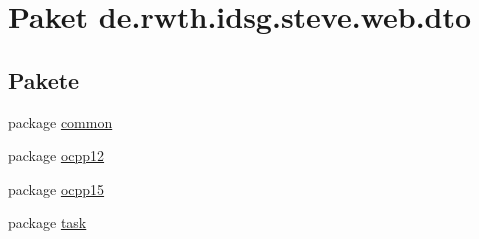 \hypertarget{namespacede_1_1rwth_1_1idsg_1_1steve_1_1web_1_1dto}{\section{Paket de.\-rwth.\-idsg.\-steve.\-web.\-dto}
\label{namespacede_1_1rwth_1_1idsg_1_1steve_1_1web_1_1dto}
}
\subsection*{Pakete}
\begin{DoxyCompactItemize}
\item 
package \hyperlink{namespacede_1_1rwth_1_1idsg_1_1steve_1_1web_1_1dto_1_1common}{common}
\item 
package \hyperlink{namespacede_1_1rwth_1_1idsg_1_1steve_1_1web_1_1dto_1_1ocpp12}{ocpp12}
\item 
package \hyperlink{namespacede_1_1rwth_1_1idsg_1_1steve_1_1web_1_1dto_1_1ocpp15}{ocpp15}
\item 
package \hyperlink{namespacede_1_1rwth_1_1idsg_1_1steve_1_1web_1_1dto_1_1task}{task}
\end{DoxyCompactItemize}
